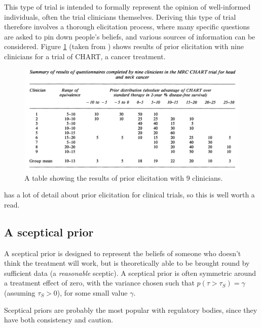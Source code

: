 \documentclass[
  openany]{book}
\theoremstyle{definition}
\theoremstyle{definition}
\theoremstyle{definition}
\theoremstyle{definition}
\theoremstyle{remark}
\begin{document}
This type of trial is intended to formally represent the opinion of well-informed individuals, often the trial clinicians themselves. Deriving this type of trial therefore involves a thorough elicitation process, where many specific questions are asked to pin down people's beliefs, and various sources of information can be considered. Figure \ref{fig:spieg-elicit} (taken from \citet{spiegelhalter1994bayesian}) shows results of prior elicitation with nine clinicians for a trial of CHART, a cancer treatment.

\begin{figure}
\centering
\includegraphics{images/spieg_elicit.png}
\caption{\label{fig:spieg-elicit}A table showing the results of prior elicitation with 9 clinicians.}
\end{figure}

\citet{spiegelhalter2004bayesian} has a lot of detail about prior elicitation for clinical trials, so this is well worth a read.

\hypertarget{a-sceptical-prior}{%
\subsection*{A sceptical prior}\label{a-sceptical-prior}}

A sceptical prior is designed to represent the beliefs of someone who doesn't think the treatment will work, but is theoretically able to be brought round by sufficient data (a \emph{reasonable} sceptic). A sceptical prior is often symmetric around a treatment effect of zero, with the variance chosen such that \(p\left(\tau>\tau_S\right) = \gamma\) (assuming \(\tau_S>0\)), for some small value \(\gamma\).

Sceptical priors are probably the most popular with regulatory bodies, since they have both consistency and caution.
\end{document}
